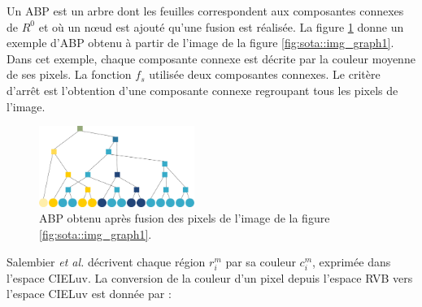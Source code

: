 Un ABP est un arbre dont les feuilles correspondent aux composantes connexes de $R^{0}$ et où un nœud est ajouté  qu'une fusion est réalisée.  La figure \ref{fig:sota:ABP} donne un exemple d'ABP obtenu à partir de l'image de la figure \ref{fig:sota::img_graph1}. Dans cet exemple, chaque composante connexe est décrite par la couleur moyenne de ses pixels. La fonction $f_{s}$ utilisée  deux composantes connexes. Le critère d'arrêt est l'obtention d'une composante connexe regroupant tous les pixels de l'image.

\begin{figure}[htb]
	\centering
			\includegraphics[width=0.45\textwidth]{images/etat-de-l-art/ABP}
		 \caption{ABP obtenu après fusion des pixels de l'image de la figure \ref{fig:sota::img_graph1}.}
		 \label{fig:sota:ABP}
\end{figure}

Salembier \textit{et al.} décrivent chaque région $r_{i}^{m}$ par sa couleur $c_{i}^{m}$, exprimée dans l'espace CIELuv. La conversion de la couleur d'un pixel depuis l'espace RVB vers l'espace CIELuv est donnée par :


